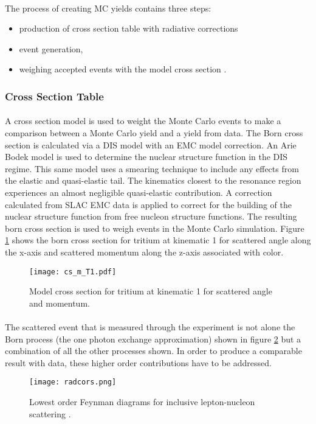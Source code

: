 \paragraph{}The process of creating MC yields contains three steps: 
\begin{itemize}
	\item production of cross section table with radiative corrections
	\item event generation,
	\item weighing accepted events with the model cross section .
\end{itemize} 
\subsubsection{Cross Section Table}
\vspace{-10pt}\paragraph{} A cross section model is used to weight the Monte Carlo events to make a comparison between a Monte Carlo yield and a yield from data. The Born cross section is calculated via a DIS model with an EMC model correction. An Arie Bodek model \cite{DISmodel} is used to determine the nuclear structure function in the DIS regime. This same model uses a smearing technique to include any effects from the elastic and quasi-elastic tail. The kinematics closest to the resonance region experiences an almost negligible quasi-elastic contribution. A correction calculated from SLAC EMC data is applied to correct for the building of the nuclear structure function from free nucleon structure functions. The resulting born cross section is used to weigh events in the Monte Carlo simulation. Figure \ref{MCS} shows the born cross section for tritium at kinematic 1 for scattered angle along the x-axis and scattered momentum along the z-axis associated with color.  

\begin{figure}
	\caption{Model cross section for tritium at kinematic 1 for scattered angle and momentum. \label{MCS}}
	\hspace{-40pt}
	\texttt{[image: cs\_m\_T1.pdf]}
\end{figure}
\paragraph{} The scattered event that is measured through the experiment is not alone the Born process (the one photon exchange approximation) shown in figure \ref{fig:radcors} but a combination of all the other processes shown. In order to produce a comparable result with data, these higher order contributions have to be addressed.
\begin{figure}[h]
	\centering
	\texttt{[image: radcors.png]}
	\caption{Lowest order Feynman diagrams for inclusive lepton-nucleon scattering \cite{Ajth}.}
	\label{fig:radcors}
\end{figure} 
